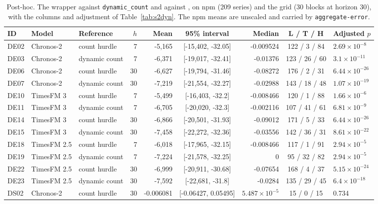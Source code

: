\begin{table}[htbp]
\centering\footnotesize\setlength{\tabcolsep}{3.5pt}
\caption{Post-hoc. The wrapper against \texttt{dynamic\_count} and against \hc{}, on npm (209 series) and
the grid (30 blocks at horizon 30), with the columns and adjustment of Table~\ref{tab:s2dyn}. The npm means
are unscaled and carried by \texttt{aggregate-error}.}
\label{tab:s2dynrest}
\begin{tabular}{lllrrcrcl}
\toprule
ID & Model & Reference & $h$ & Mean & 95\% interval & Median & L / T / H & Adjusted $p$ \\
\midrule
DE02 & Chronos-2 & count hurdle & 7 & -5,165 & [-15,402, -32.05] & -0.009524 & 122 / 3 / 84 & $2.69 \times 10^{-8}$ \\
DE03 & Chronos-2 & dynamic count & 7 & -6,371 & [-19,017, -32.41] & -0.01376 & 123 / 26 / 60 & $3.1 \times 10^{-11}$ \\
DE06 & Chronos-2 & count hurdle & 30 & -6,627 & [-19,794, -31.46] & -0.08272 & 176 / 2 / 31 & $6.44 \times 10^{-26}$ \\
DE07 & Chronos-2 & dynamic count & 30 & -7,219 & [-21,554, -32.27] & -0.02988 & 143 / 18 / 48 & $1.07 \times 10^{-19}$ \\
DE10 & TimesFM 3 & count hurdle & 7 & -5,499 & [-16,403, -32.2] & -0.008466 & 120 / 1 / 88 & $1.66 \times 10^{-6}$ \\
DE11 & TimesFM 3 & dynamic count & 7 & -6,705 & [-20,020, -32.3] & -0.002116 & 107 / 41 / 61 & $6.81 \times 10^{-9}$ \\
DE14 & TimesFM 3 & count hurdle & 30 & -6,866 & [-20,501, -31.93] & -0.09012 & 171 / 5 / 33 & $6.44 \times 10^{-26}$ \\
DE15 & TimesFM 3 & dynamic count & 30 & -7,458 & [-22,272, -32.36] & -0.03556 & 142 / 36 / 31 & $8.61 \times 10^{-22}$ \\
DE18 & TimesFM 2.5 & count hurdle & 7 & -6,018 & [-17,965, -32.15] & -0.008466 & 117 / 1 / 91 & $2.94 \times 10^{-5}$ \\
DE19 & TimesFM 2.5 & dynamic count & 7 & -7,224 & [-21,578, -32.25] & 0 & 95 / 32 / 82 & $2.94 \times 10^{-5}$ \\
DE22 & TimesFM 2.5 & count hurdle & 30 & -6,999 & [-20,911, -30.68] & -0.07654 & 168 / 4 / 37 & $5.15 \times 10^{-24}$ \\
DE23 & TimesFM 2.5 & dynamic count & 30 & -7,592 & [-22,681, -31.8] & -0.0284 & 135 / 29 / 45 & $6.4 \times 10^{-18}$ \\
\midrule
DS02 & Chronos-2 & count hurdle & 30 & -0.006081 & [-0.06427, 0.05495] & $5.487 \times 10^{-5}$ & 15 / 0 / 15 & 0.734 \\

\end{tabular}
\end{table}
